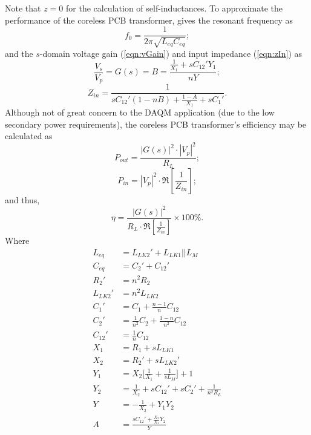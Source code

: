 \documentclass[conference]{IEEEtran}
\begin{document}
\hspace{-15pt}Note that $z = 0$ for the calculation of self-inductances. 
To approximate the performance of the coreless PCB transformer, \cite{TangHuiFundamental} gives the resonant frequency as
%
\begin{equation}
	f_{0} = \frac{1}{2\pi\sqrt{L_{eq}C_{eq}}};
\end{equation}
%
and the $s$-domain voltage gain (\ref{eqn:vGain}) and input impedance (\ref{eqn:zIn}) as
%
\begin{equation}
	\label{eqn:vGain}
	\frac{V_{s}}{V_{p}} = G(s) = B = \frac{\frac{1}{X_{1}}+sC_{12}'Y_{1}}{nY};
\end{equation}
%
\begin{equation}
	\label{eqn:zIn}
	Z_{in} = \frac{1}{sC_{12}'(1-nB)+\frac{1-A}{X_{1}}+sC_{1}'}.
\end{equation}
%
Although not of great concern to the DAQM application (due to the low secondary power requirements), the coreless PCB transformer's efficiency  may be calculated as \cite{TangHuiFundamental}
\begin{equation}
	P_{out} = \frac{|G(s)|^{2}\cdot|V_{p}|^{2}}{R_{L}};
\end{equation}
\begin{equation}
	P_{in} = |V_{p}|^{2}\cdot\Re \left[ \frac{1}{Z_{in}} \right];
\end{equation}
and thus,
\begin{equation}
	\eta = \frac{|G(s)|^{2}}{R_{L}\cdot\Re \left[ \frac{1}{Z_{in}} \right]}\times 100 \%.
\end{equation}
%
Where
%
\begin{align*}
	L_{eq}   &= L_{LK2}'+L_{LK1}||L_{M} 	\\
	C_{eq}   &= C_{2}'+C_{12}'				\\
	R_{2}'   &= n^{2}R_{2}					\\
	L_{LK2}' &= n^{2}L_{LK2}				\\
	C_{1}'   &= C_{1} + \frac{n-1}{n}C_{12}	\\
	C_{2}'   &= \frac{1}{n^{2}}C_{2} + \frac{1-n}{n^{2}}C_{12}	\\
	C_{12}'  &= \frac{1}{n}C_{12}			\\
	X_{1}    &= R_{1}  + sL_{LK1}			\\
	X_{2}    &= R_{2}' + sL_{LK2}'			\\
	Y_{1}    &= X_{2} \lbrack \frac{1}{X_{1}} + \frac{1}{sL_{M}} \rbrack +1	\\
	Y_{2}    &= \frac{1}{X_{2}} + sC_{12}' + sC_{2}' + \frac{1}{n^{2}R_{L}}	\\
	Y        &= -\frac{1}{X_{2}} + Y_{1}Y_{2}	\\
	A        &= \frac{sC_{12}' + \frac{X_{2}}{X_{1}} Y_{2}}{Y}
\end{align*}
%
\end{document}
